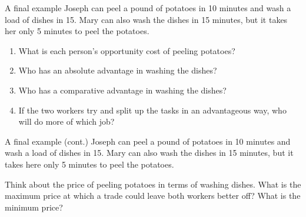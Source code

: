 \documentclass[aspectratio=169]{beamer}
\begin{document}
\begin{frame}{A final example}
    Joseph can peel a pound of potatoes in 10 minutes and wash a load of dishes in 15. Mary can also wash the dishes in 15 minutes, but it takes her only 5 minutes to peel the potatoes. 
    
    \begin{enumerate}
        \item What is each person's opportunity cost of peeling potatoes?
        \item Who has an absolute advantage in washing the dishes?
        \item Who has a comparative advantage in washing the dishes?
        \item If the two workers try and split up the tasks in an advantageous way, who will do more of which job?
    \end{enumerate}

\end{frame}

\begin{frame}{A final example (cont.)}
    Joseph can peel a pound of potatoes in 10 minutes and wash a load of dishes in 15. Mary can also wash the dishes in 15 minutes, but it takes here only 5 minutes to peel the potatoes. 
    
    \medskip

    Think about the price of peeling potatoes in terms of washing dishes. What is the maximum price at which a trade could leave both workers better off? What is the minimum price?

\end{frame}
\end{document}
